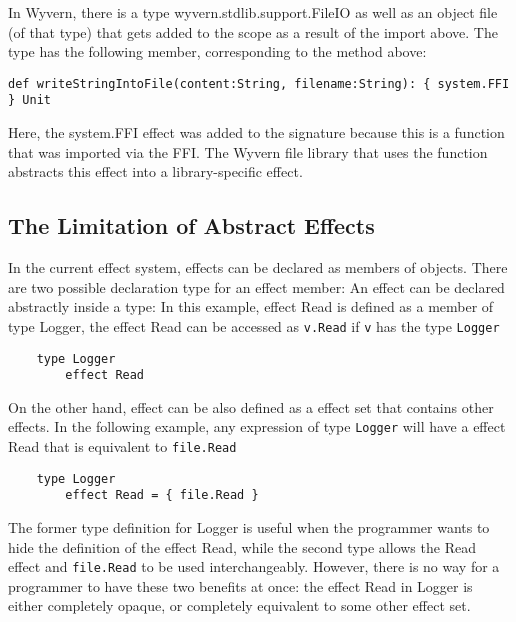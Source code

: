 In Wyvern, there is a type wyvern.stdlib.support.FileIO as well as an object file (of that type) that gets added to the scope as a result of the import above. The type has the following member, corresponding to the method above: \\
\begin{minipage}{\linewidth}
\begin{lstlisting}[xleftmargin=-5pt, numbers=none]
  def writeStringIntoFile(content:String, filename:String): { system.FFI } Unit 
\end{lstlisting}
\end{minipage}

Here, the system.FFI effect was added to the signature because this is a function that was imported via the FFI. The Wyvern file library that uses the  function abstracts this  effect into a library-specific  effect.


\subsection{The Limitation of  Abstract Effects}

In the current effect system, effects can be declared as members of objects. There are two possible declaration type for an effect member: An effect can be declared abstractly inside a type: In this example, effect Read is defined as a member of type Logger, the effect Read can be accessed as \texttt{v.Read} if \texttt{v} has the type \texttt{Logger}
\begin{verbatim}
    type Logger
        effect Read
\end{verbatim}
On the other hand, effect can be also defined as a effect set that contains other effects. In the following example, any expression of type \texttt{Logger} will have a effect Read that is equivalent to \texttt{file.Read}
\begin{verbatim}
    type Logger
        effect Read = { file.Read }
\end{verbatim}
The former type definition for Logger is useful when the programmer wants to hide the definition of the effect Read, while the second type allows the Read effect and \texttt{file.Read} to be used interchangeably. However, there is no way for a programmer to have these two benefits at once: the effect Read in Logger is either completely opaque, or completely equivalent to some other effect set.





